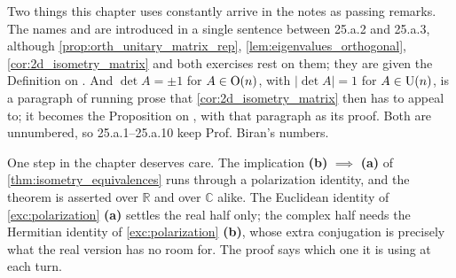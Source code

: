 
\begin{ainote}
Two things this chapter uses constantly arrive in the notes as passing remarks.
The names  and 
are introduced in a single sentence between 25.a.2 and 25.a.3, although
\cref{prop:orth_unitary_matrix_rep}, \cref{lem:eigenvalues_orthogonal},
\cref{cor:2d_isometry_matrix} and both exercises rest on them; they are given
the Definition on . And
$\det A = \pm 1$ for $A \in \operatorname{O}(n)$, with $|\det A| = 1$ for $A \in \operatorname{U}(n)$,
is a paragraph of running prose that \cref{cor:2d_isometry_matrix} then has to
appeal to; it becomes the Proposition on
, with that paragraph as its proof. Both
are unnumbered, so 25.a.1--25.a.10 keep Prof. Biran's numbers.

One step in the chapter deserves care. The implication \textbf{(b)}
$\implies$ \textbf{(a)} of \cref{thm:isometry_equivalences} runs through a
polarization identity, and the theorem is asserted over $\mathbb{R}$ and over
$\mathbb{C}$ alike. The Euclidean identity of \cref{exc:polarization}
\textbf{(a)} settles the real half only; the complex half needs the Hermitian
identity of \cref{exc:polarization} \textbf{(b)}, whose extra conjugation is
precisely what the real version has no room for. The proof says which one it is
using at each turn.
\end{ainote}


